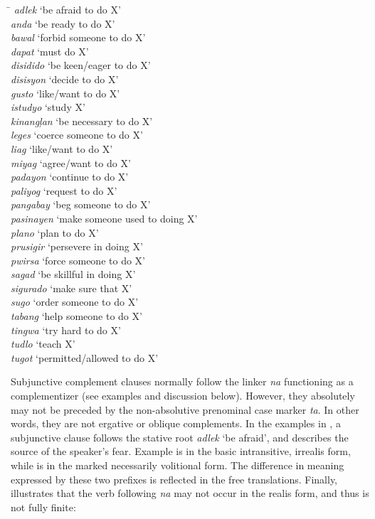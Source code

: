 \ea
\label{ex:listofctpstakingsubjunctivecomplements}
\begin{tabbing}
\hspace{2cm} \= \kill
\textit{adlek } \>  ‘be afraid to do X’ \\
\textit{anda  } \>  ‘be ready to do X’  \\
\textit{bawal } \>   ‘forbid someone to do X’  \\
\textit{dapat  } \>  ‘must do X’ \\
\textit{disidido } \>   ‘be keen/eager to do X’ \\
\textit{disisyon } \>  ‘decide to do X’ \\
\textit{gusto  } \>  ‘like/want to do X’ \\
\textit{istudyo } \>  ‘study X’ \\
\textit{kinangļan } \>   ‘be necessary to do X’ \\
\textit{leges  } \>  ‘coerce someone to do X’ \\
\textit{liag } \>  ‘like/want to do X’ \\
\textit{miyag  } \>  ‘agree/want to do X’ \\
\textit{padayon  } \>  ‘continue to do X’  \\
\textit{paliyog  } \>  ‘request to do X’  \\
\textit{pangabay } \>   ‘beg someone to do X’  \\
\textit{pasinayen } \>  ‘make someone used to doing X’  \\
\textit{plano } \>  ‘plan to do X’ \\
\textit{prusigir } \>  ‘persevere in doing X’  \\
\textit{pwirsa } \>   ‘force someone to do X’ \\
\textit{sagad } \>  ‘be skillful in doing X’ \\
\textit{sigurado } \>  ‘make sure that X’ \\
\textit{sugo  } \>  ‘order someone to do X’  \\
\textit{tabang } \>  ‘help someone to do X’ \\
\textit{tingwa } \>  ‘try hard to do X’ \\
\textit{tudlo  } \>  ‘teach X’ \\
\textit{tugot  } \>  ‘permitted/allowed to do X’
\end{tabbing}
\z

Subjunctive complement clauses normally follow the linker \textit{na} functioning as a complementizer (see examples and discussion below). However, they absolutely may not be preceded by the non-absolutive prenominal case marker \textit{ta}. In other words, they are not ergative or oblique complements. In the examples in , a subjunctive clause follows the stative root \textit{adlek} ‘be afraid’, and describes the source of the speaker’s fear. Example  is in the basic intransitive, irrealis form, while  is in the marked necessarily volitional form. The difference in meaning expressed by these two prefixes is reflected in the free translations. Finally,  illustrates that the verb following \textit{na} may not occur in the realis form, and thus is not fully finite:

